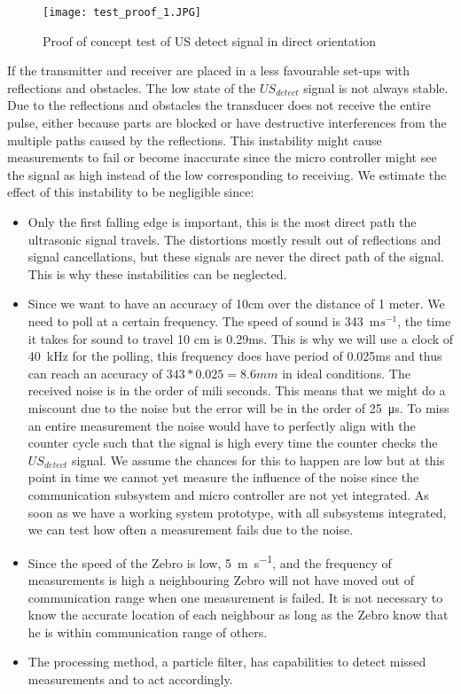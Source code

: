 \begin{figure}[H]
\centering
\texttt{[image: test\_proof\_1.JPG]}
\caption{Proof of concept test of US detect signal in direct orientation}\label{fig:proof_test_1}
\end{figure}

If the transmitter and receiver are placed in a less favourable set-ups with reflections and obstacles.
The low state of the $US_{detect}$ signal is not always stable. %
Due to the reflections and obstacles the transducer does not receive the entire pulse, either because parts are blocked or have destructive interferences from the multiple paths caused by the reflections.
This instability might cause measurements to fail or become inaccurate since the micro controller might see the signal as high instead of the low corresponding to receiving.
We estimate the effect of this instability to be negligible since:

\begin{itemize}
\item
Only the first falling edge is important, this is the most direct path the ultrasonic signal travels. The distortions mostly result out of reflections and signal cancellations, but these signals are never the direct path of the signal. This is why these instabilities can be neglected.
\item
Since we want to have an accuracy of 10cm over the distance of 1 meter. We need to poll at a certain frequency. The speed of sound is \SI{343}{\meter}$s^{-1}$, the time it takes for sound to travel 10 cm is 0.29ms. This is why we will use a clock of \SI{40}{\kilo\hertz} for the polling, this frequency does have period of 0.025ms and thus can reach an accuracy of $343 * 0.025 = 8.6 mm$ in ideal conditions.
The received noise is in the order of mili seconds. This means that we might do a miscount due to the noise but the error will be in the order of \SI{25}{\micro\second}.
To miss an entire measurement the noise would have to perfectly align with the counter cycle such that the signal is high every time the counter checks the $US_{detect}$ signal.
We assume the chances for this to happen are low but at this point in time we cannot yet measure the influence of the noise since the communication subsystem and micro controller are not yet integrated.
As soon as we have a working system prototype, with all subsystems integrated, we can test how often a measurement fails due to the noise.
\item
Since the speed of the Zebro is low, \SI{5}{\meter\per\second}, and the frequency of measurements is high a neighbouring Zebro will not have moved out of communication range when one measurement is failed.
It is not necessary to know the accurate location of each neighbour as long as the Zebro know that he is within communication range of others.
\item
The processing method, a particle filter, has capabilities to detect missed measurements and to act accordingly. \cite{processing}
\end{itemize}

